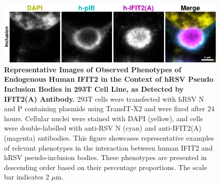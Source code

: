 \begin{figure}
    \centering
    \includegraphics[width=1\linewidth]{09. Chapter 4/Figs/01. pIB/03. IFIT2/02. IFIT2A/03. i2a-293t-hnhp.pdf} 
    \caption[Representative Images of Observed Phenotypes of Endogenous Human IFIT2 in the Context of hRSV Pseudo Inclusion Bodies in 293T Cell Line, as Detected by IFIT2(A) Antibody.]{\textbf{Representative Images of Observed Phenotypes of Endogenous Human IFIT2 in the Context of hRSV Pseudo Inclusion Bodies in 293T Cell Line, as Detected by IFIT2(A) Antibody.} 293T cells were transfected with hRSV N and P containing plasmids using TransIT-X2 and were fixed after 24 hours. Cellular nuclei were stained with DAPI (yellow), and cells were double-labelled with anti-RSV N (cyan) and anti-IFIT2(A) (magenta) antibodies. This figure showcases representative examples of relevant phenotypes in the interaction between human IFIT2 and hRSV pseudo-inclusion bodies. These phenotypes are presented in descending order based on their percentage proportions. The scale bar indicates 2 \(\mu \mbox{m}\).}
    \label{fig:Representative Images of Observed Phenotypes of Endogenous Human IFIT2 in the Context of hRSV Pseudo Inclusion Bodies in 293T Cell Line, as Detected by IFIT2(A) Antibody}
\end{figure}

